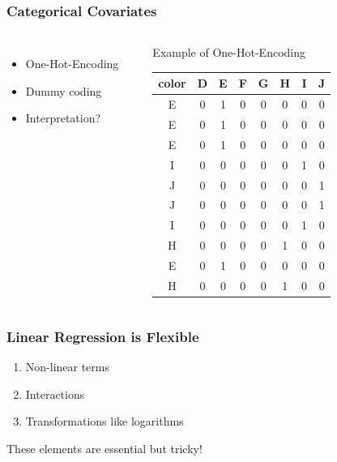 \begin{frame}
	\frametitle{Categorical Covariates}
	\begin{columns}[onlytextwidth]
		\begin{itemize}
			\item One-Hot-Encoding
			\item Dummy coding
			\item Interpretation?
		\end{itemize}
		
		\vspace{1cm}
		
		\begin{example}
		\end{example}
		
		\begin{block}{\centering Example of One-Hot-Encoding}
			\begin{small}
				\begin{table}
					\begin{tabular}{c|ccccccc}
						color& D& E& F &G&H &I &J \\
						\hline
						E  &   0  &   1  &   0  &   0  &   0  &   0  &   0 \\
						E  &   0  &   1  &   0  &   0  &   0  &   0  &   0 \\
						E  &   0  &   1  &   0  &   0  &   0  &   0  &   0 \\
						I  &   0  &   0  &   0  &   0  &   0  &   1  &   0 \\
						J  &   0  &   0  &   0  &   0  &   0  &   0  &   1 \\
						J  &   0  &   0  &   0  &   0  &   0  &   0  &   1 \\
						I  &   0  &   0  &   0  &   0  &   0  &   1  &   0 \\
						H  &   0  &   0  &   0  &   0  &   1  &   0  &   0 \\
						E  &   0  &   1  &   0  &   0  &   0  &   0  &   0 \\
						H  &   0  &   0  &   0  &   0  &   1  &   0  &   0 \\
						\hline
					\end{tabular}
				\end{table}
			\end{small}
		\end{block}
	\end{columns}
\end{frame}

\begin{frame}
	\frametitle{Linear Regression is Flexible}
	\begin{enumerate}
		\item Non-linear terms
		\item Interactions
		\item Transformations like logarithms
	\end{enumerate}
	
	\vfill
	
	\begin{alertblock}{These elements are essential but tricky!}
	\end{alertblock}
\end{frame}

